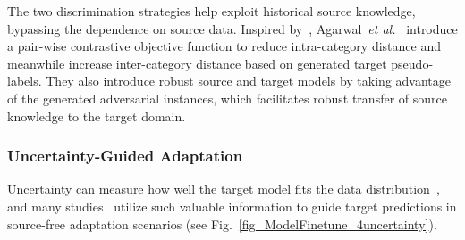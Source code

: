 \documentclass[10pt,journal,compsoc]{IEEEtran}
\def\etal{{\em et al.}}
\begin{document}
The two discrimination strategies help exploit historical source knowledge, bypassing the dependence on source data.
Inspired by~\cite{sohn2016improved}, Agarwal~\etal~\cite{agarwal2022unsupervised} introduce a pair-wise contrastive objective function to reduce intra-category distance and meanwhile increase inter-category distance based on generated target pseudo-labels. 
They also introduce robust source and target models by taking advantage of the generated adversarial instances, which facilitates robust transfer of source knowledge to the target domain.


\subsubsection{Uncertainty-Guided Adaptation}
Uncertainty can measure how well the target model fits the data distribution~\cite{gawlikowski2021survey}, and many studies~\cite{fleuret2021uncertainty, lee2022feature, chen2021source, xu2022denoising, hegde2021uncertainty, roy2022uncertainty, pei2022uncertainty, li2021free} utilize such valuable information to guide target predictions in source-free adaptation scenarios (see Fig.~\ref{fig_ModelFinetune_4uncertainty}).
\end{document}

